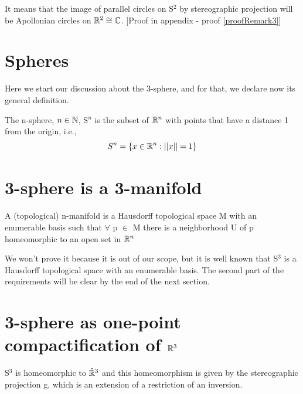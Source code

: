 \begin{obs}
It means that the image of parallel circles on S$^2$ by stereographic projection will be Apollonian circles on $\mathbb{R}^2 \cong \mathbb{C}$.
[Proof in appendix - proof \ref{proofRemark3}]
\end{obs}




\section{Spheres}

Here we start our discussion about the 3-sphere, and for that, we declare now its general definition.

\begin{definicao}[n-sphere]
The n-sphere, $n \in \mathbb{N}$,  S$^n$ is the subset of $\mathbb{R}^n$ with points that have a distance 1 from the origin, i.e.,
\begin{equation*}
    S^{n} = \{x \in \mathbb{R}^{n} : || x || = 1\}
\end{equation*}
\end{definicao}

\section{3-sphere is a 3-manifold}

\begin{definicao}
A (topological) n-manifold is a Hausdorff topological space M with an enumerable basis such that $\forall$ p $\in$ M there is a neighborhood U of p homeomorphic to an open set in $\mathbb{R}^n$
\end{definicao}

We won't prove it because it is out of our scope, but it is well known that S$^3$ is a Hausdorff topological space with an enumerable basis. The second part of the requirements will be clear by the end of the next section.

\section{3-sphere as one-point compactification of $\mathbb{R}^3$}
S$^3$ is homeomorphic to $\hat{\mathbb{R}}^3$ and this homeomorphism is given by the stereographic projection g, which is an extension of a restriction of an inversion.

